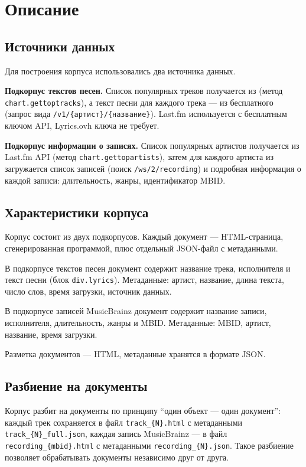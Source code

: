 \section{Описание}

\subsection{Источники данных}
Для построения корпуса использовались два источника данных.

\textbf{Подкорпус текстов песен.} Список популярных треков получается из
 (метод \texttt{chart.gettoptracks}),
а текст песни для каждого трека --- из бесплатного
 (запрос вида
\texttt{/v1/\{артист\}/\{название\}}). Last.fm используется с бесплатным ключом
API, Lyrics.ovh ключа не требует.

\textbf{Подкорпус информации о записях.} Список популярных артистов получается
из Last.fm API (метод \texttt{chart.gettopartists}), затем для каждого артиста из
 загружается
список записей (поиск \texttt{/ws/2/recording}) и подробная информация о каждой
записи: длительность, жанры, идентификатор MBID.

\subsection{Характеристики корпуса}
Корпус состоит из двух подкорпусов. Каждый документ --- HTML-страница,
сгенерированная программой, плюс отдельный JSON-файл с метаданными.

В подкорпусе текстов песен документ содержит название трека, исполнителя и текст
песни (блок \texttt{div.lyrics}). Метаданные: артист, название, длина текста,
число слов, время загрузки, источник данных.

В подкорпусе записей MusicBrainz документ содержит название записи, исполнителя,
длительность, жанры и MBID. Метаданные: MBID, артист, название, время загрузки.

Разметка документов --- HTML, метаданные хранятся в формате JSON.

\subsection{Разбиение на документы}
Корпус разбит на документы по принципу \enquote{один объект --- один документ}:
каждый трек сохраняется в файл \texttt{track\_\{N\}.html} с метаданными
\texttt{track\_\{N\}\_full.json}, каждая запись MusicBrainz --- в файл
\texttt{recording\_\{mbid\}.html} с метаданными \texttt{recording\_\{N\}.json}.
Такое разбиение позволяет обрабатывать документы независимо друг от друга.

